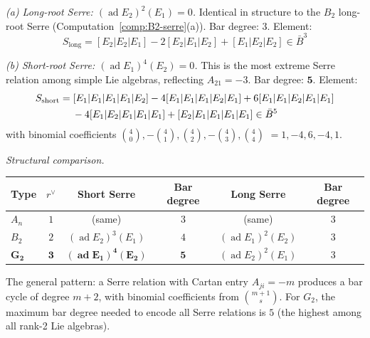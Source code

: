 \begin{computation}
\label{comp:G2-serre}

\emph{(a) Long-root Serre:
$(\operatorname{ad} E_2)^2(E_1) = 0$.}
Identical in structure to the $B_2$ long-root Serre
(Computation~\ref{comp:B2-serre}(a)).
Bar degree: $3$.  Element:
\[
S_{\mathrm{long}} = [E_2|E_2|E_1] - 2[E_2|E_1|E_2]
+ [E_1|E_2|E_2] \in \bar{B}^3
\]

\emph{(b) Short-root Serre: $(\operatorname{ad} E_1)^4(E_2) = 0$.}
This is the most extreme Serre relation among simple Lie algebras,
reflecting $A_{21} = -3$.  Bar degree: $\mathbf{5}$.  Element:
\begin{align}
S_{\mathrm{short}} &= [E_1|E_1|E_1|E_1|E_2]
- 4[E_1|E_1|E_1|E_2|E_1]
+ 6[E_1|E_1|E_2|E_1|E_1] \notag \\
&\quad\; - 4[E_1|E_2|E_1|E_1|E_1]
+ [E_2|E_1|E_1|E_1|E_1]
\in \bar{B}^5
\end{align}
with binomial coefficients
$\binom{4}{0}, -\binom{4}{1}, \binom{4}{2}, -\binom{4}{3},
\binom{4}{4}$
$= 1, -4, 6, -4, 1$.

\emph{Structural comparison.}
\begin{center}
\renewcommand{\arraystretch}{1.2}
\begin{tabular}{lccccc}
\textbf{Type} & \textbf{$r^\vee$} &
\textbf{Short Serre} & \textbf{Bar degree} &
\textbf{Long Serre} & \textbf{Bar degree} \\
\hline
$A_n$ & $1$ & (same) & $3$ & (same) & $3$ \\
$B_2$ & $2$ & $(\operatorname{ad} E_2)^3(E_1)$ & $4$ &
  $(\operatorname{ad} E_1)^2(E_2)$ & $3$ \\
$\mathbf{G_2}$ & $\mathbf{3}$ &
  $\mathbf{(\operatorname{ad} E_1)^4(E_2)}$ & $\mathbf{5}$ &
  $(\operatorname{ad} E_2)^2(E_1)$ & $3$
\end{tabular}
\end{center}
The general pattern: a Serre relation with Cartan entry $A_{ji} = -m$
produces a bar cycle of degree $m+2$, with binomial coefficients
from $\binom{m+1}{s}$.  For $G_2$, the maximum bar degree needed
to encode all Serre relations is $5$ (the highest among all rank-2
Lie algebras).
\end{computation}

